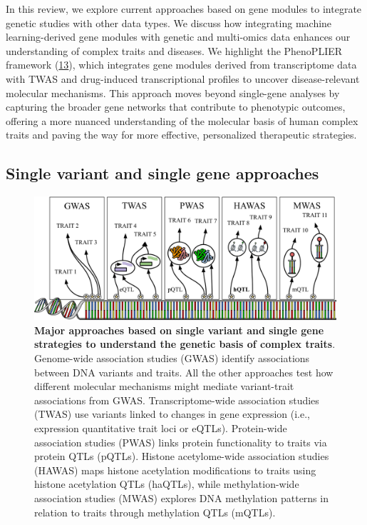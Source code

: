 In this review, we explore current approaches based on gene modules to integrate genetic studies with other data types.
We discuss how integrating machine learning-derived gene modules with genetic and multi-omics data enhances our understanding of complex traits and diseases.
We highlight the PhenoPLIER framework (\protect\hyperlink{ref-NM3rHx1i}{13}), which integrates gene modules derived from transcriptome data with TWAS and drug-induced transcriptional profiles to uncover disease-relevant molecular mechanisms.
This approach moves beyond single-gene analyses by capturing the broader gene networks that contribute to phenotypic outcomes, offering a more nuanced understanding of the molecular basis of human complex traits and paving the way for more effective, personalized therapeutic strategies.

\hypertarget{single-variant-and-single-gene-approaches}{%
\subsection{Single variant and single gene approaches}\label{single-variant-and-single-gene-approaches}}

\begin{figure}
\hypertarget{fig:fig1}{%
\centering
\includegraphics[width=1\textwidth,height=\textheight]{images/fig1.svg}
\caption{\textbf{Major approaches based on single variant and single gene strategies to understand the genetic basis of complex traits}.
Genome-wide association studies (GWAS) identify associations between DNA variants and traits.
All the other approaches test how different molecular mechanisms might mediate variant-trait associations from GWAS.
Transcriptome-wide association studies (TWAS) use variants linked to changes in gene expression (i.e., expression quantitative trait loci or eQTLs).
Protein-wide association studies (PWAS) links protein functionality to traits via protein QTLs (pQTLs).
Histone acetylome-wide association studies (HAWAS) maps histone acetylation modifications to traits using histone acetylation QTLs (haQTLs), while methylation-wide association studies (MWAS) explores DNA methylation patterns in relation to traits through methylation QTLs (mQTLs).}\label{fig:fig1}
}
\end{figure}

